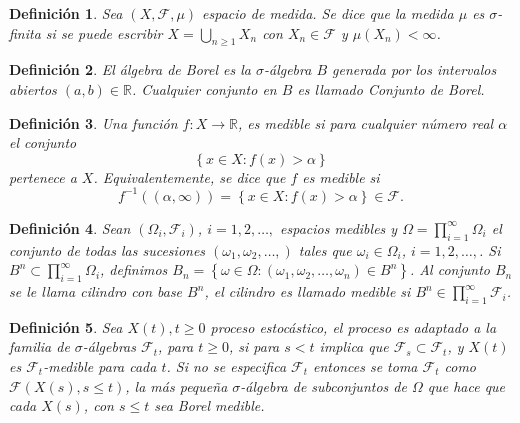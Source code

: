 \documentclass{article}
\newtheorem{Def}{Definición}[section]
\newcommand{\rea}{\mathbb{R}}
\numberwithin{equation}{section}
\begin{document}
\begin{Def}
Sea $\left(X,\mathcal{F},\mu\right)$ espacio de medida. Se dice que la medida $\mu$ es $\sigma$-finita si se puede escribir $X=\bigcup_{n\geq1}X_{n}$ con $X_{n}\in\mathcal{F}$ y $\mu\left(X_{n}\right)<\infty$.
\end{Def}

\begin{Def}\label{Cto.Borel}
El \'algebra de Borel es la $\sigma$-\'algebra $B$ generada por los intervalos abiertos $\left(a,b\right)\in\rea$. Cualquier conjunto en $B$ es llamado {\em Conjunto de Borel}.
\end{Def}

\begin{Def}\label{Funcion.Medible}
Una funci\'on $f:X\rightarrow\rea$, es medible si para cualquier n\'umero real $\alpha$ el conjunto \[\left\{x\in X:f\left(x\right)>\alpha\right\}\] pertenece a $X$. Equivalentemente, se dice que $f$ es medible si \[f^{-1}\left(\left(\alpha,\infty\right)\right)=\left\{x\in X:f\left(x\right)>\alpha\right\}\in\mathcal{F}.\]
\end{Def}

\begin{Def}\label{Def.Cilindros}
Sean $\left(\Omega_{i},\mathcal{F}_{i}\right)$, $i=1,2,\ldots,$ espacios medibles y $\Omega=\prod_{i=1}^{\infty}\Omega_{i}$ el conjunto de todas las sucesiones $\left(\omega_{1},\omega_{2},\ldots,\right)$ tales que $\omega_{i}\in\Omega_{i}$, $i=1,2,\ldots,$. Si $B^{n}\subset\prod_{i=1}^{\infty}\Omega_{i}$, definimos $B_{n}=\left\{\omega\in\Omega:\left(\omega_{1},\omega_{2},\ldots,\omega_{n}\right)\in B^{n}\right\}$. Al conjunto $B_{n}$ se le llama {\em cilindro} con base $B^{n}$, el cilindro es llamado medible si $B^{n}\in\prod_{i=1}^{\infty}\mathcal{F}_{i}$.
\end{Def}


\begin{Def}\label{Def.Proc.Adaptado}
Sea $X\left(t\right),t\geq0$ proceso estoc\'astico, el proceso es adaptado a la familia de $\sigma$-\'algebras $\mathcal{F}_{t}$, para $t\geq0$, si para $s<t$ implica que $\mathcal{F}_{s}\subset\mathcal{F}_{t}$, y $X\left(t\right)$ es $\mathcal{F}_{t}$-medible para cada $t$. Si no se especifica $\mathcal{F}_{t}$ entonces se toma $\mathcal{F}_{t}$ como $\mathcal{F}\left(X\left(s\right),s\leq t\right)$, la m\'as peque\~na $\sigma$-\'algebra de subconjuntos de $\Omega$ que hace que cada $X\left(s\right)$, con $s\leq t$ sea Borel medible.
\end{Def}
\end{document}

